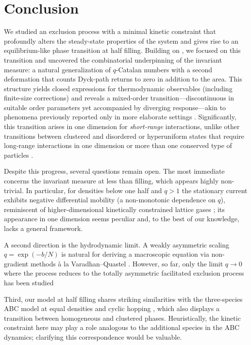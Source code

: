 \documentclass[pdflatex,sn-mathphys-num]{sn-jnl}
\theoremstyle{definition}
\theoremstyle{remark}
\numberwithin{equation}{section}
\begin{document}
\section{Conclusion}
We studied an exclusion process with a minimal kinetic constraint that profoundly alters the steady-state properties of the system and gives rise to an equilibrium-like phase transition at half filling. 
Building on \cite{grosskinsky2025long}, we focused on this transition and uncovered the combinatorial underpinning of the invariant measure: a natural generalization of $q$-Catalan numbers with a second deformation that counts Dyck-path returns to zero in addition to the area. This structure yields closed expressions for thermodynamic observables (including finite-size corrections) and reveals a mixed-order transition—discontinuous in suitable order parameters yet accompanied by diverging response—akin to phenomena previously reported only in more elaborate settings \cite{bar2014mixed}. Significantly, this transition arises in one dimension
for {\it short-range} interactions, unlike other transitions between clustered
and disordered or hyperuniform states that require long-range interactions
in one dimension \cite{Kare17,Kare22} or more than one conserved type of particles \cite{Evan98b,Lahi00,Chak16}.

Despite this progress, several questions remain open. The most immediate concerns the invariant measure at less than filling, which appears highly non-trivial. In particular, for densities below one half and $q>1$ the stationary current exhibits negative differential mobility (a non-monotonic dependence on $q$), reminiscent of higher-dimensional kinetically constrained lattice gases \cite{benichou2014microscopic,sellitto2008asymmetric}; its appearance in one dimension seems peculiar and, to the best of our knowledge, lacks a general framework.

A second direction is the hydrodynamic limit. A weakly asymmetric scaling $q=\exp(-b/N)$ is natural for deriving a macroscopic equation via non-gradient methods à la Varadhan–Quastel \cite{kipnis2013scaling}.
However, so far, only the limit $q\to 0$ where the process reduces
to the totally asymmetric facilitated exclusion process has been studied \cite{Scho04,Blon20,Blon21}

Third, our model at half filling shares striking similarities with the three-species ABC model at equal densities and cyclic hopping \cite{clincy2003phase}, which also displays a transition between homogeneous and clustered phases. Heuristically, the kinetic constraint here may play a role analogous to the additional species in the ABC dynamics; clarifying this correspondence would be valuable.
\end{document}
